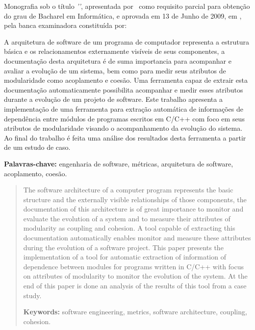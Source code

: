 

\capa
\folhaderosto

\begin{folhadeaprovacao}
 Monografia sob o título \textit{'\ABNTtitulodata'}, apresentada por
 \ABNTautordata\ como requisito parcial para obtenção do grau de Bacharel em
 Informática, e aprovada em 13 de Junho de 2009, em \ABNTlocaldata, pela banca
 examinadora constituída por:
\end{folhadeaprovacao}

\begin{resumo}
A arquitetura de software de um programa de computador representa a estrutura
básica e os relacionamentos externamente visíveis de seus componentes, a
documentação desta arquitetura é de suma importancia para acompanhar e avaliar
a evolução de um sistema, bem como para medir seus atributos de modularidade
como acoplamento e coesão. Uma ferramenta capaz de extrair esta documentação
automaticamente possibilita acompanhar e medir esses atributos durante a
evolução de um projeto de software. Este trabalho apresenta a implementação de
uma ferramenta para extração automática de informações de dependência entre
módulos de programas escritos em C/C++ com foco em seus atributos de
modularidade visando o acompanhamento da evolução do sistema. Ao final do
trabalho é feita uma análise dos resultados desta ferramenta a partir de um
estudo de caso.

{\bf Palavras-chave:} engenharia de software, métricas, arquitetura de
software, acoplamento, coesão.
\end{resumo}

\begin{abstract}
The software architecture of a computer program represents the basic structure
and the externally visible relationships of those components, the documentation
of this architecture is of great importance to monitor and evaluate the
evolution of a system and to measure their attributes of modularity as coupling
and cohesion. A tool capable of extracting this documentation automatically
enables monitor and measure these attributes during the evolution of a software
project. This paper presents the implementation of a tool for automatic
extraction of information of dependence between modules for programs written in
C/C++ with focus on attributes of modularity to monitor the evolution of the
system. At the end of this paper is done an analysis of the results of this
tool from a case study.

{\bf Keywords:} software engineering, metrics, software architecture, coupling,
cohesion.
\end{abstract}

\sumario
\listadefiguras
\listadetabelas
\listadesiglas

{}
\clearpage
\apendice


